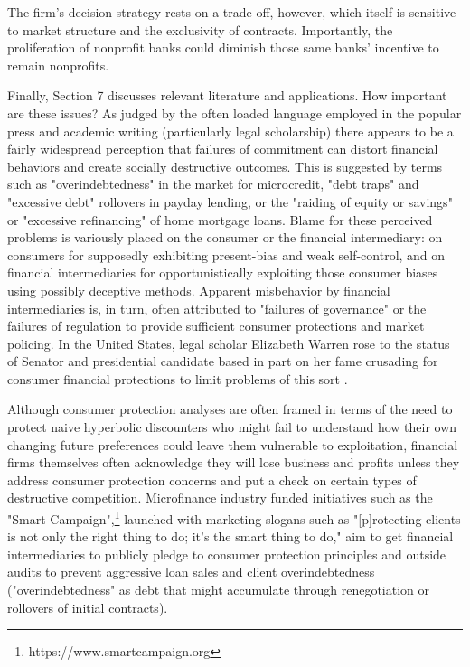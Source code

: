 \documentclass[11pt,english]{article}
\theoremstyle{plain}
\theoremstyle{definition}
\begin{document}
The firm's decision strategy rests on a trade-off, however, which itself is sensitive to market structure and the exclusivity of contracts. Importantly, the proliferation of nonprofit banks could diminish those same banks' incentive to remain nonprofits. 

Finally, Section 7 discusses relevant literature and  applications. How important are these issues? As judged by the often loaded language employed in the popular press and academic writing (particularly legal scholarship) there appears to be a fairly widespread perception that failures of commitment can distort financial behaviors and create socially destructive outcomes. This is suggested by terms such as "overindebtedness" in the market for microcredit, "debt traps" and "excessive debt" rollovers in payday lending, or the "raiding of equity or savings" or "excessive refinancing" of home mortgage loans. Blame for these perceived problems is variously placed on the consumer or the financial intermediary: on consumers for supposedly exhibiting present-bias and weak self-control, and on financial intermediaries for opportunistically exploiting those consumer biases using possibly deceptive methods. Apparent misbehavior by financial intermediaries is, in turn, often attributed to "failures of governance" or the failures of regulation to provide sufficient consumer protections and market policing. In the United States, legal scholar Elizabeth Warren rose to the status of Senator and presidential candidate based in part on her fame crusading for consumer financial protections to limit problems of this sort \citep{sullivan2000}.

Although consumer protection analyses are often framed in terms of the need to protect naive hyperbolic discounters who might fail to understand how their own changing future preferences could leave them vulnerable to exploitation, financial firms themselves often acknowledge they will lose business and profits unless they address consumer protection concerns and put a check on certain types of destructive competition. Microfinance
industry funded initiatives such as the "Smart Campaign",\footnote{https://www.smartcampaign.org} launched with marketing slogans such as "{[}p{]}rotecting clients is not only the right thing to do; it's the smart thing to do," aim to get financial intermediaries to publicly pledge to consumer protection principles and outside audits to prevent aggressive loan sales and client overindebtedness ("overindebtedness" as debt that might accumulate through renegotiation or rollovers of initial contracts).
\end{document}
